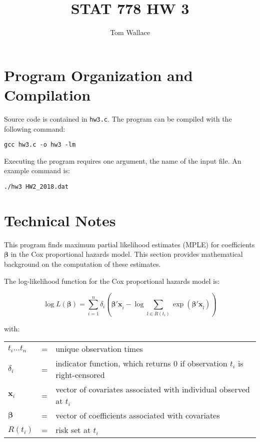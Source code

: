 \documentclass{article}
\author{Tom Wallace}
\title{STAT 778 HW 3}
\begin{document}
\maketitle

\section*{Program Organization and Compilation}

Source code is contained in \texttt{hw3.c}. The program can be compiled with the
following command:

\begin{center}
	\texttt{gcc hw3.c -o hw3 -lm }
\end{center}

Executing the program requires one
argument, the name of the input file. An example command is:

\begin{center}
	\texttt{./hw3 HW2\_2018.dat}
\end{center}

\section*{Technical Notes}

This program finds maximum partial likelihood estimates (MPLE) for coefficients
$\bm{\beta}$ in the Cox proportional hazards model. This
section provides mathematical background on the computation of these estimates.

The log-likelihood function for the Cox proportional hazards model is:

\begin{equation}
\log L(\bm{\beta}) = \sum_{i=1}^n \delta_i \left( \bm{\beta'x}_i - \log \sum_{l
\in R(t_i)} \exp{(\bm{\beta' x}_l)}\right)
\end{equation}

with:
\begin{tabular}{l c l}
$t_i...t_n$ & = & unique observation times \\
$\delta_i$ & = & indicator function, which returns 0 if observation $t_i$ is
right-censored \\
$\bm{x}_i$ & = & vector of covariates associated with individual observed at
$t_i$ \\
$\bm{\beta}$ & = & vector of coefficients associated with covariates \\
$R(t_i)$ & = & risk set at $t_i$
\end{tabular}
\end{document}
